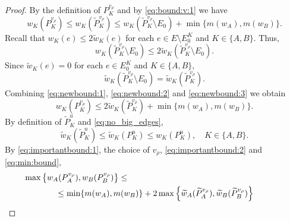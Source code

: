 \documentclass{llncs}
\newcommand{\agentVariable}{K}
\begin{document}
\begin{proof}
By the definition of $P_{\agentVariable}^{v_{\rho}}$ and by \eqref{eq:bound:v:1} we have 
\begin{equation} \label{eq:newbound:1}
w_{\agentVariable}(P_{\agentVariable}^{v_{\rho}}) \leq w_{\agentVariable}(\widetilde{P}_{\agentVariable}^{v_{\rho}}) 
\leq w_{\agentVariable}(\widetilde{P}_{\agentVariable}^{v_{\rho}}\setminus E_0) + \min\{m(w_A),m(w_B)\}.
\end{equation}
Recall that  ${w_{\agentVariable}}(e) \leq 2\widetilde{w}_{\agentVariable}(e)$ 
for each $e\in E \setminus E_0^{\agentVariable}$ and ${\agentVariable}\in\{A,B\}$.
Thus,
\begin{equation} \label{eq:newbound:2}
w_{\agentVariable}(\widetilde{P}_{\agentVariable}^{v_{\rho}}\setminus E_0) \leq  
2\widetilde{w}_{\agentVariable}(\widetilde{P}_{\agentVariable}^{v_{\rho}}\setminus E_0).
\end{equation}
Since $\widetilde{w}_{\agentVariable}(e)=0$ for each $e\in E_0^{\agentVariable}$ and ${\agentVariable}\in\{A,B\}$,
\begin{equation} \label{eq:newbound:3}   
\widetilde{w}_{\agentVariable}(\widetilde{P}_{\agentVariable}^{v_{\rho}}\setminus E_0) 
=
\widetilde{w}_{\agentVariable}(\widetilde{P}_{\agentVariable}^{v_{\rho}}).
\end{equation}
Combining \eqref{eq:newbound:1}, \eqref{eq:newbound:2} and \eqref{eq:newbound:3} we obtain 
\begin{equation} \label{eq:importantbound:1}
w_{\agentVariable}(P_{\agentVariable}^{v_{\rho}}) \leq 2 \widetilde{w}_{\agentVariable}(\widetilde{P}_{\agentVariable}^{v_{\rho}}) + \min\{m(w_A),m(w_B)\}.
\end{equation}
By definition of $\widetilde{P}_{\agentVariable}^{u}$ and \eqref{eq:no_big_edges},
\begin{equation} \label{eq:importantbound:2}
\widetilde{w}_{\agentVariable}(\widetilde{P}_{\agentVariable}^{u}) \leq
\widetilde{w}_{\agentVariable}(P_{\agentVariable}^{u}) \leq
w_{\agentVariable}(P_{\agentVariable}^{u}), \quad \agentVariable\in\{A,B\}.
\end{equation}
By \eqref{eq:importantbound:1}, the choice of $v_{\rho}$, \eqref{eq:importantbound:2} and \eqref{eq:min:bound},
\begin{gather*}
\max\left\{w_A(P_A^{v_{\rho}}),w_B(P_B^{v_{\rho}})\right\} \leq 
\hspace*{6cm}\phantom{123} \\
\begin{align}
& \leq \min\{m(w_A),m(w_B)\} + 2\max\left\{\widetilde{w}_{A}(\widetilde{P}_A^{v_{\rho}}),\widetilde{w}_{B}(\widetilde{P}_B^{v_{\rho}})\right\} \nonumber \\

\end{align}
\end{gather*}
\end{proof}
\end{document}
